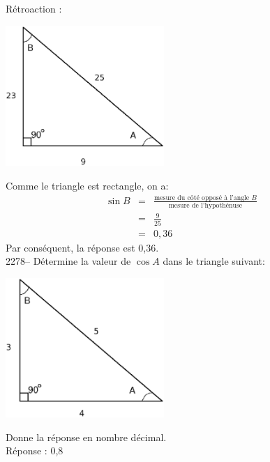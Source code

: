 \documentclass[letterpaper, 12pt]{article}
\begin{document}
R\'etroaction :\\
\begin{center}
 \includegraphics[width=6cm,bb=14 14 434 387]{Triangle_rectangle2277.eps}
\end{center}
Comme le triangle est rectangle, on a:
\begin{eqnarray*}
 \sin{B}&=&\frac{\textrm{mesure du c\^ot\'e oppos\'e \`a l'angle $B$}}{\textrm{mesure de l'hypoth\'enuse}}\\
&=&\frac{9}{25}\\[2mm]
&=&0,36
\end{eqnarray*}
Par cons\'equent, la r\'eponse est 0,36.\\

2278-- D\'etermine la valeur de $\cos{A}$ dans le triangle suivant:
\begin{center}
 \includegraphics[width=6cm,bb=14 14 445 371]{Triangle_rectangle2276.eps}
\end{center}
Donne la r\'eponse en nombre d\'ecimal.\\

R\'eponse : 0,8\\
\end{document}
